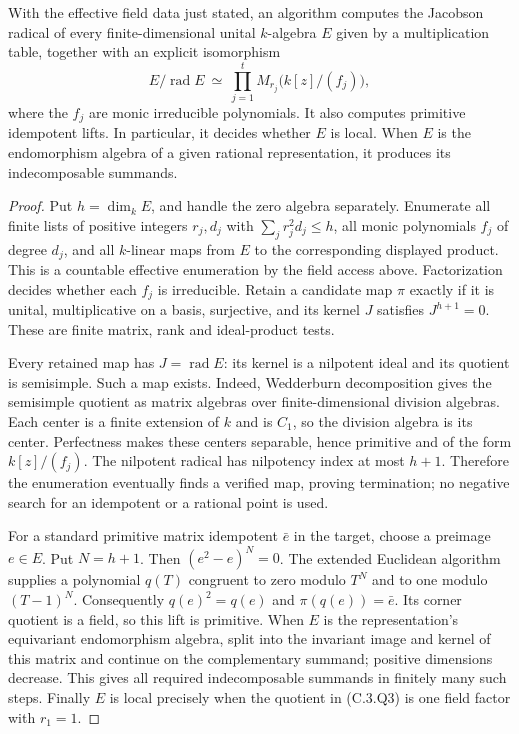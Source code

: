 \begin{lemma}
\label{C:C1_algebra_certificates}
With the effective field data just stated, an algorithm computes the
Jacobson radical of every finite-dimensional unital $k$-algebra $E$
given by a multiplication table, together with an explicit isomorphism
\[
 E/\operatorname{rad}E\ \simeq\
          \prod_{j=1}^t M_{r_j}\bigl(k[z]/(f_j)\bigr),      \tag{C.3.Q3}
\]
where the $f_j$ are monic irreducible polynomials. It also computes
primitive idempotent lifts. In particular, it decides whether $E$
is local. When $E$ is the endomorphism algebra of a given rational
representation, it produces its indecomposable summands.
\end{lemma}
\begin{proof}
Put $h=\dim_k E$, and handle the zero algebra separately. Enumerate
all finite lists of positive integers $r_j,d_j$ with
$\sum_jr_j^2d_j\le h$, all monic polynomials $f_j$ of degree $d_j$,
and all $k$-linear maps from $E$ to the corresponding displayed product.
This is a countable effective enumeration by the field access above.
Factorization decides whether each $f_j$ is irreducible. Retain a
candidate map $\pi$ exactly if it is unital, multiplicative on a basis,
surjective, and its kernel $J$ satisfies $J^{h+1}=0$.
These are finite matrix, rank and ideal-product tests.

Every retained map has $J=\operatorname{rad}E$: its kernel is a
nilpotent ideal and its quotient is semisimple. Such a map exists.
Indeed, Wedderburn decomposition gives the semisimple quotient as
matrix algebras over finite-dimensional division algebras. Each center
is a finite extension of $k$ and is $C_1$, so the division algebra
is its center. Perfectness makes these centers separable, hence
primitive and of the form $k[z]/(f_j)$. The nilpotent radical has
nilpotency index at most $h+1$. Therefore the enumeration eventually
finds a verified map, proving termination; no negative search for an
idempotent or a rational point is used.

For a standard primitive matrix idempotent $\bar e$ in the target,
choose a preimage $e\in E$. Put $N=h+1$. Then
$(e^2-e)^N=0$. The extended Euclidean algorithm supplies a polynomial
$q(T)$ congruent to zero modulo $T^N$ and to one modulo $(T-1)^N$.
Consequently $q(e)^2=q(e)$ and $\pi(q(e))=\bar e$.
Its corner quotient is a field, so this lift is primitive.
When $E$ is the representation's equivariant endomorphism algebra,
split into the invariant image and kernel of this matrix and continue
on the complementary summand; positive dimensions
decrease. This gives all required indecomposable summands in finitely
many such steps. Finally $E$ is local precisely when the quotient
in (C.3.Q3) is one field factor with $r_1=1$.
\end{proof}

